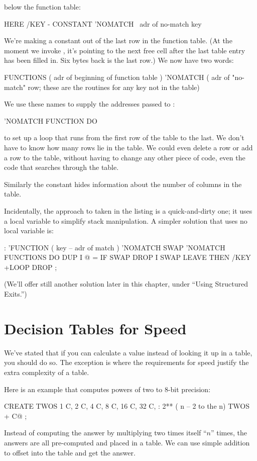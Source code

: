 below the function table:
\begin{Code}
HERE /KEY -  CONSTANT 'NOMATCH  \  adr of no-match key
\end{Code}
We're making a constant out of the last row in the function table. (At the
moment we invoke , it's pointing to the next free cell after the last
table entry has been filled in. Six bytes back is the last row.) We now have
two words:
\begin{Code}
FUNCTIONS  ( adr of beginning of function table )
'NOMATCH   ( adr of "no-match" row; these are the
             routines for any key not in the table)
\end{Code}
We use these names to supply the addresses passed to :
\begin{Code}
'NOMATCH FUNCTION DO
\end{Code}
to set up a loop that runs from the first row of the table to the last. We
don't have to know how many rows lie in the table. We could even delete a
row or add a row to the table, without having to change any other piece of
code, even the code that searches through the table.

Similarly the constant  hides information about the number of
columns in the table.

Incidentally, the approach to  taken in the listing is a
quick-and-dirty one; it uses a local variable to simplify stack
manipulation. A simpler solution that uses no local variable is:
\begin{Code}
: 'FUNCTION  ( key -- adr of match )
   'NOMATCH SWAP  'NOMATCH FUNCTIONS DO  DUP
      I @ =  IF SWAP DROP I SWAP  LEAVE  THEN
   /KEY +LOOP  DROP ;
\end{Code}
(We'll offer still another solution later in this chapter, under ``Using
Structured Exits.'')

\section{Decision Tables for Speed}

We've stated that if you can calculate a value instead of looking it up in a
table, you should do so. The exception is where the requirements for
speed justify the extra complexity of a table.

Here is an example that computes powers of two to 8-bit precision:

\begin{Code}
CREATE TWOS
   1 C,  2 C,  4 C,  8 C,  16 C,  32 C,
: 2**  ( n -- 2 to the n)
   TWOS +  C@ ;
\end{Code}
Instead of computing the answer by multiplying two times itself ``$n$''
times, the answers are all pre-computed and placed in a table. We can use
simple addition to offset into the table and get the answer.

